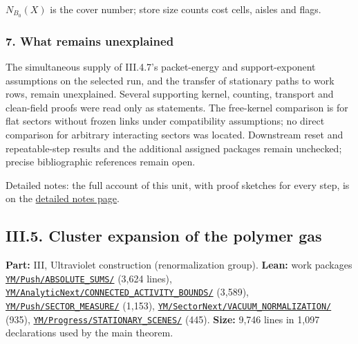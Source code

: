 \documentclass[
  letterpaper,
  11pt]{article}
\begin{document}
\(N_{B_0}(X)\) is the cover number; store size counts cost cells, aisles
and flags.

\subsubsection{7. What remains
unexplained}\label{what-remains-unexplained-6}

The simultaneous supply of III.4.7's packet-energy and support-exponent
assumptions on the selected run, and the transfer of stationary paths to
work rows, remain unexplained. Several supporting kernel, counting,
transport and clean-field proofs were read only as statements. The
free-kernel comparison is for flat sectors without frozen links under
compatibility assumptions; no direct comparison for arbitrary
interacting sectors was located. Downstream reset and repeatable-step
results and the additional assigned packages remain unchecked; precise
bibliographic references remain open.

Detailed notes: the full account of this unit, with proof sketches for
every step, is on the
\href{https://github.com/scottnarmstrong/yang-mills-informalization/blob/main/outline/notes/III-4.md}{detailed
notes page}.

\subsection{III.5. Cluster expansion of the polymer
gas}\label{iii.5.-cluster-expansion-of-the-polymer-gas}

\textbf{Part:} III, Ultraviolet construction (renormalization group).
\textbf{Lean:} work packages
\href{https://github.com/yang-mills-group/OpenAI-YM-20261028/tree/3456e5e75cf8d4cd558955a5c7638fba2d68f464/YM/Push/ABSOLUTE_SUMS}{\texttt{YM/Push/ABSOLUTE\_SUMS/}}
(3,624 lines),
\href{https://github.com/yang-mills-group/OpenAI-YM-20261028/tree/3456e5e75cf8d4cd558955a5c7638fba2d68f464/YM/AnalyticNext/CONNECTED_ACTIVITY_BOUNDS}{\texttt{YM/AnalyticNext/CONNECTED\_ACTIVITY\_BOUNDS/}}
(3,589),
\href{https://github.com/yang-mills-group/OpenAI-YM-20261028/tree/3456e5e75cf8d4cd558955a5c7638fba2d68f464/YM/Push/SECTOR_MEASURE}{\texttt{YM/Push/SECTOR\_MEASURE/}}
(1,153),
\href{https://github.com/yang-mills-group/OpenAI-YM-20261028/tree/3456e5e75cf8d4cd558955a5c7638fba2d68f464/YM/SectorNext/VACUUM_NORMALIZATION}{\texttt{YM/SectorNext/VACUUM\_NORMALIZATION/}}
(935),
\href{https://github.com/yang-mills-group/OpenAI-YM-20261028/tree/3456e5e75cf8d4cd558955a5c7638fba2d68f464/YM/Progress/STATIONARY_SCENES}{\texttt{YM/Progress/STATIONARY\_SCENES/}}
(445). \textbf{Size:} 9,746 lines in 1,097 declarations used by the main
theorem.
\end{document}
